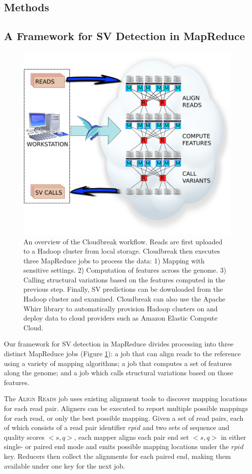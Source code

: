 \documentclass{bioinfo}
\begin{document}
\begin{methods}
\section{Methods}

\subsection{A Framework for SV Detection in MapReduce}

\begin{figure}
\centering
\includegraphics[width=.5\textwidth]{workflow_with_whirr.png}
\caption{An overview of the Cloudbreak workflow. Reads are first uploaded to a Hadoop cluster from local storage. Cloudbreak then executes three MapReduce jobs to process the data: 1) Mapping with sensitive settings. 2) Computation of features across the genome. 3) Calling structural variations based on the features computed in the previous step. Finally, SV predictions can be downloaded from the Hadoop cluster and examined. Cloudbreak can also use the Apache Whirr library to automatically provision Hadoop clusters on and deploy data to cloud providers such as Amazon Elastic Compute Cloud.}
\label{cloudbreak_workflow}
\end{figure}

Our framework for SV detection in MapReduce divides processing into three distinct MapReduce jobs (Figure \ref{cloudbreak_workflow}): a job that can align reads to the reference using a variety of mapping algorithms; a job that computes a set of features along the genome; and a job which calls structural variations based on those features.

The \textsc{Align Reads} job uses existing alignment tools to discover mapping locations for each read pair. Aligners can be executed to report multiple possible mappings for each read, or only the best possible mapping. Given a set of read pairs, each of which consists of a read pair identifier $rpid$ and two sets of sequence and quality scores $<s,q>$, each mapper aligns each pair end set $<s,q>$ in either single- or paired end mode and emits possible mapping locations under the $rpid$ key. Reducers then collect the alignments for each paired end, making them available under one key for the next job. 


\end{methods}
\end{document}

